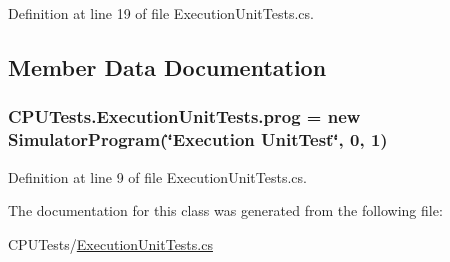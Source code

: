 Definition at line 19 of file Execution\+Unit\+Tests.\+cs.



\subsection{Member Data Documentation}
\hypertarget{class_c_p_u_tests_1_1_execution_unit_tests_ae1fcdd0e50525d444de369e0c9edcf14}{}
\subsubsection[{prog}]{ C\+P\+U\+Tests.\+Execution\+Unit\+Tests.\+prog = new {\bf Simulator\+Program}(\char`\"{}Execution Unit\+Test\char`\"{}, 0, 1)\hspace{0.3cm}{\ttfamily [private]}}\label{class_c_p_u_tests_1_1_execution_unit_tests_ae1fcdd0e50525d444de369e0c9edcf14}


Definition at line 9 of file Execution\+Unit\+Tests.\+cs.



The documentation for this class was generated from the following file\+:\begin{DoxyCompactItemize}
\item 
C\+P\+U\+Tests/\hyperlink{_execution_unit_tests_8cs}{Execution\+Unit\+Tests.\+cs}\end{DoxyCompactItemize}
